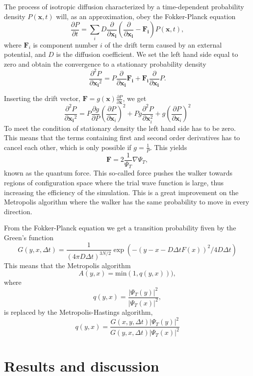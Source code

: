 \documentclass[11pt]{article}
\begin{document}
The process of isotropic diffusion characterized by a time-dependent
probability density $P\left(\mathbf{x},t\right)$ will, as an approximation,
obey the Fokker-Planck equation
\[
\frac{\partial P}{\partial t}=\sum_{i}D\frac{\partial}{\partial\mathbf{x_{i}}}\left(\frac{\partial}{\partial\mathbf{x_{i}}}-\mathbf{F_{i}}\right)P(\mathbf{x},t),
\]
where $\mathbf{F}_{i}$ is component number $i$ of the drift term
caused by an external potential, and $D$ is the diffusion coefficient.
We set the left hand side equal to zero and obtain the convergence
to a stationary probability density
\[
\frac{\partial^{2}P}{\partial{\mathbf{x_{i}}^{2}}}=P\frac{\partial}{\partial{\mathbf{x_{i}}}}\mathbf{F_{i}}+\mathbf{F_{i}}\frac{\partial}{\partial{\mathbf{x_{i}}}}P.
\]


Inserting the drift vector, $\mathbf{F}=g(\mathbf{x})\frac{\partial P}{\partial\mathbf{x}}$,
we get
\[
\frac{\partial^{2}P}{\partial{\mathbf{x_{i}}^{2}}}=P\frac{\partial g}{\partial P}\left(\frac{\partial P}{\partial{\mathbf{x}_{i}}}\right)^{2}+Pg\frac{\partial^{2}P}{\partial{\mathbf{x}_{i}^{2}}}+g\left(\frac{\partial P}{\partial{\mathbf{x}_{i}}}\right)^{2}
\]
To meet the condition of stationary density the left hand side has
to be zero. This means that the terms containing first and second
order derivatives has to cancel each other, which is only possible
if $g=\frac{1}{P}$. This yields
\[
\mathbf{F}=2\frac{1}{\Psi_{T}}\nabla\Psi_{T},
\]
known as the quantum force. This so-called force pushes the walker
towards regions of configuration space where the trial wave function
is large, thus increasing the efficiency of the simulation. This is
a great improvement on the Metropolis algorithm where the walker has
the same probability to move in every direction.

From the Fokker-Planck equation we get a transition probability fiven
by the Green's function
\[
G(y,x,\Delta t)=\frac{1}{(4\pi D\Delta t)^{3N/2}}\exp{\left(-(y-x-D\Delta tF(x))^{2}/4D\Delta t\right)}
\]
This means that the Metropolis algorithm
\[
A(y,x)=\mathrm{min}(1,q(y,x))),
\]
where 
\[
q(y,x)=\frac{|\Psi_{T}(y)|^{2}}{|\Psi_{T}(x)|^{2}},
\]
is replaced by the Metropolis-Hastings algorithm,
\[
q(y,x)=\frac{G(x,y,\Delta t)|\Psi_{T}(y)|^{2}}{G(y,x,\Delta t)|\Psi_{T}(x)|^{2}}
\]




\section{Results and discussion}
	
\end{document}
